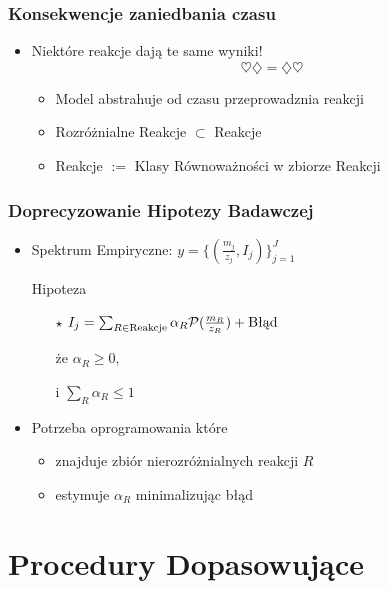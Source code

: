 \documentclass[xetex]{beamer}
\begin{document}

	\begin{frame}\frametitle{Konsekwencje zaniedbania czasu}	
		\begin{itemize}
			\item Niektóre reakcje dają te same wyniki!
				$$\heartsuit \diamondsuit = \diamondsuit \heartsuit$$
			\begin{itemize}
				\item Model abstrahuje od czasu przeprowadznia reakcji
				\item Rozróżnialne Reakcje $\subset$ Reakcje
				\item Reakcje $:=$ Klasy Równoważności w zbiorze Reakcji 
			\end{itemize}
		\end{itemize}
	\end{frame}


	\begin{frame}\frametitle{Doprecyzowanie Hipotezy Badawczej} 
		\begin{itemize}
			\item 	Spektrum Empiryczne: $y = \Big\{ (\frac{m_j}{z_j}, I_j) \Big\}_{j = 1}^{J}$
			\item[] Hipoteza
			\begin{itemize}
				\item[$\star$] $I_j = \sum_{R \in \text{Reakcje}} \alpha_R \mathcal{P}(\frac{m_R}{z_R}) + \text{Błąd}$
				\item[że] $\alpha_R \geq 0,$ 
				\item[i] $\sum_R \alpha_R \leq 1$
			\end{itemize}
			\item[]
			\item 	Potrzeba oprogramowania które
			\begin{itemize}
				\item 	znajduje zbiór nierozróżnialnych reakcji $R$
				\item 	estymuje $\alpha_R$ minimalizując błąd
			\end{itemize}
		\end{itemize}
	\end{frame}

\section[Dopasowanie]{Procedury Dopasowujące}	
\end{document}

